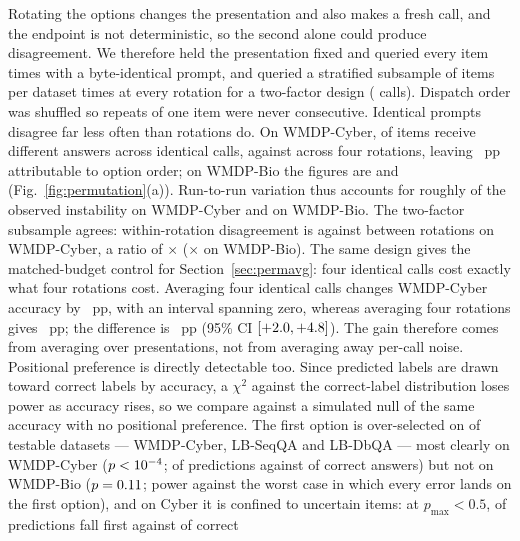 \documentclass[conference,compsoc]{IEEEtran}
\newcommand{\pmax}{p_{\max}}
\begin{document}
Rotating the options changes
the presentation and also makes a fresh call, and the endpoint is not deterministic, so
the second alone could produce disagreement. We therefore held the presentation fixed
and queried every item \statReRepeats{} times with a byte-identical prompt, and queried
a stratified subsample of \statReFacItems{} items per dataset \statReFacRepeats{} times
at every rotation for a two-factor design (\statReCalls{} calls). Dispatch order was
shuffled so repeats of one item were never consecutive.
Identical prompts disagree far less often than rotations do. On WMDP-Cyber,
\statReIdentCyber{} of items receive different answers across \statReRepeats{} identical
calls, against \statReRotCyber{} across four rotations, leaving \statReGapCyber{}~pp
attributable to option order; on WMDP-Bio the figures are \statReIdentBio{} and
\statReRotBio{} (Fig.~\ref{fig:permutation}(a)). Run-to-run variation thus accounts for
roughly \statReNoiseShareCyber{} of the observed instability on WMDP-Cyber and
\statReNoiseShareBio{} on WMDP-Bio. The two-factor subsample agrees: within-rotation
disagreement is \statReWithinCyber{} against \statReBetweenCyber{} between rotations on
WMDP-Cyber, a ratio of \statReRatioCyber{}$\times$ (\statReRatioBio{}$\times$ on WMDP-Bio). The same design gives the matched-budget control for Section~\ref{sec:permavg}:
four identical calls cost exactly what four rotations cost. Averaging four identical
calls changes WMDP-Cyber accuracy by \statReGainIdentCyber{}~pp, with an interval
spanning zero, whereas averaging four rotations gives \statReGainRotCyber{}~pp; the
difference is \statReGainDiffCyber{}~pp (95\% CI $[+2.0, +4.8]{}$). The gain
therefore comes from averaging over presentations, not from averaging away per-call
noise. Positional preference is directly detectable too. Since predicted labels are drawn
toward correct labels by accuracy, a $\chi^2$ against the correct-label distribution
loses power as accuracy rises, so we compare against a simulated null of the same
accuracy with no positional preference. The first option is over-selected on \statNSigPosDatasets{} of \statNTestedPosDatasets{}
testable datasets --- WMDP-Cyber, LB-SeqQA and LB-DbQA --- most clearly on WMDP-Cyber ($p <10^{-4}{}$; \statPosPredACyber{} of predictions against
\statPosGoldACyber{} of correct answers) but not on WMDP-Bio ($p = 0.11{}$; power \statPosPowerBio{} against the worst
case in which every error lands on the first option), and on Cyber it is confined to
uncertain items: at $\pmax <
0.5$, \statPosLowPredA{} of predictions fall first against \statPosLowGoldA{} of correct
\end{document}
